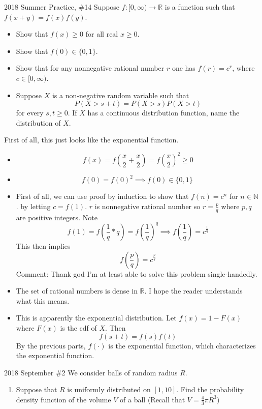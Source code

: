 \documentclass[../main]{subfiles}
\begin{document}
\begin{bbox}{{2018 Summer Practice, \#14}}
    Suppose $f: [0,\infty) \to \mathbb R$ is a function such that $f(x+y) = f(x)f(y)$.
    \begin{itemize}
        \item Show that $f(x)\geq 0$ for all real $x \geq 0$.
        \item Show that $f(0) \in \{0,1\}$.
        \item Show that for any nonnegative rational number $r$ one has $f(r)=c^r$, where $c\in[0,\infty)$.
        \item Suppose $X$ is a non-negative random variable such that 
        \[
        P(X > s+t) = P(X>s) P(X>t)
        \] for every $s,t \geq 0$. If $X$ has a continuous distribution function, name the distribution of $X$.
    \end{itemize}
\end{bbox}
\begin{solution}
    First of all, this just looks like the exponential function.
    \begin{itemize}
        \item \[
        f(x) = f(\frac{x}{2} + \frac{x}{2}) = f(\frac{x}{2})^2 \geq 0
        \]
        \item \[
        f(0) = f(0)^2 \implies f(0) \in \{0,1\}
        \
        \]
        \item First of all, we can use proof by induction to show that $f(n) = c^n$ for $n\in \mathbb N$. by letting $c = f(1)$.
        \newline
        $r$ is nonnegative rational number so $r=\frac{p}{q}$ where $p,q$ are positive integers. Note \[
        f(1) = f\left(\frac{1}{q} * q\right) =f\left(\frac{1}{q}\right)^q \implies f\left(\frac{1}{q}\right) = c^{\frac{1}{q}} 
        \]
        This then implies \[
        f\left(\frac{p}{q}\right) = c^{\frac{p}{q}}
        \]
        Comment: Thank god I'm at least able to solve this problem single-handedly.
        \item The set of rational numbers is dense in $\mathbb R$. I hope the reader understands what this means.
        \item This is apparently the exponential distribution.
        \newline
        Let $f(x) = 1 - F(x)$ where $F(x)$ is the cdf of $X$. Then 
        \[
        f(s+t) = f(s)f(t)
        \]
        By the previous parts, $f(\cdot)$ is the exponential function, which characterizes the exponential function.
    \end{itemize}
\end{solution}
\begin{bbox}{2018 September \#2}
    We consider balls of random radius $R$.
    \begin{enumerate}
        \item Suppose that $R$ is uniformly distributed on $[1,10]$. Find the probability density function of the volume $V$ of a ball (Recall that $V=\frac{4}{3}\pi R^3)$
    \end{enumerate}
\end{bbox}
\end{document}
